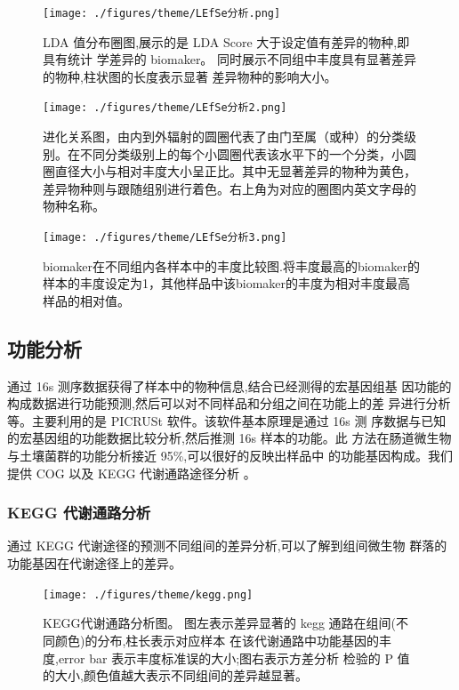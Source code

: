 \documentclass[a4paper,10pt]{article}
\numberwithin{figure}{section}
\numberwithin{table}{section}
\begin{document}
\begin{figure}[H]
\centering
\label{Fig:LEfSe}
\captionsetup{width=.8\textwidth,singlelinecheck = false, justification=justified}
 \texttt{[image: ./figures/theme/LEfSe分析.png]}
 \caption{LDA 值分布圈图,展示的是 LDA Score 大于设定值有差异的物种,即具有统计
学差异的 biomaker。 同时展示不同组中丰度具有显著差异的物种,柱状图的长度表示显著
差异物种的影响大小。}
\end{figure}

\begin{figure}[H]
\centering
\label{Fig:LEfSe2}
\captionsetup{width=.8\textwidth,singlelinecheck = false, justification=justified}
 \texttt{[image: ./figures/theme/LEfSe分析2.png]}
 \caption{进化关系图，由内到外辐射的圆圈代表了由门至属（或种）的分类级别。在不同分类级别上的每个小圆圈代表该水平下的一个分类，小圆圈直径大小与相对丰度大小呈正比。其中无显著差异的物种为黄色，差异物种则与跟随组别进行着色。右上角为对应的圈图内英文字母的物种名称。}
\end{figure}

\begin{figure}[H]
\centering
\label{Fig:LEfSe3}
\captionsetup{width=.8\textwidth,singlelinecheck = false, justification=justified}
 \texttt{[image: ./figures/theme/LEfSe分析3.png]}
 \caption{biomaker在不同组内各样本中的丰度比较图.将丰度最高的biomaker的样本的丰度设定为1，其他样品中该biomaker的丰度为相对丰度最高样品的相对值。}
\end{figure}

\newpage
\subsection{功能分析}
\label{Subsec: functionalAnalysis}
通过 16s 测序数据获得了样本中的物种信息,结合已经测得的宏基因组基
因功能的构成数据进行功能预测,然后可以对不同样品和分组之间在功能上的差
异进行分析等。主要利用的是 PICRUSt \cite{Langille2013Predictive}软件。该软件基本原理是通过 16s 测
序数据与已知的宏基因组的功能数据比较分析,然后推测 16s 样本的功能。此
方法在肠道微生物与土壤菌群的功能分析接近 95\%,可以很好的反映出样品中
的功能基因构成。我们提供 COG 以及 KEGG 代谢通路途径分析 \cite{Kanehisa2008KEGG}。
\subsubsection{KEGG 代谢通路分析}
\label{Subsubsec：KEGG}
通过 KEGG 代谢途径的预测不同组间的差异分析,可以了解到组间微生物
群落的功能基因在代谢途径上的差异。
\begin{figure}[H]
\centering
\label{Fig:kegg}
\captionsetup{width=.8\textwidth,singlelinecheck = false, justification=justified}
 \texttt{[image: ./figures/theme/kegg.png]}  
   \caption{KEGG代谢通路分析图。 图左表示差异显著的 kegg 通路在组间(不同颜色)的分布,柱长表示对应样本
在该代谢通路中功能基因的丰度,error bar 表示丰度标准误的大小;图右表示方差分析
检验的 P 值的大小,颜色值越大表示不同组间的差异越显著。}
\end{figure}
\newpage
\end{document}
